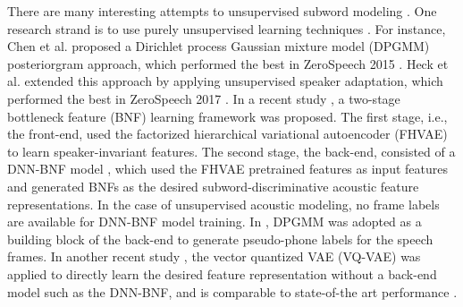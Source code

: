 \documentclass[a4paper]{article}
\begin{document}
There are many interesting attempts  to unsupervised subword modeling \cite{chen2015parallel,heck2017feature,chorowski2019unsupervised,shibata2017composite,feng2019_TASLP,riviere2020unsupervised,Feng2019combining}. One research strand is to use purely unsupervised learning techniques 
\cite{chen2015parallel,heck2017feature,chorowski2019unsupervised}. For instance, Chen et al. \cite{chen2015parallel} proposed a Dirichlet process Gaussian mixture model (DPGMM) posteriorgram approach, which performed the best in ZeroSpeech 2015 \cite{versteegh2015zero}.  Heck et al. extended this approach by applying unsupervised speaker adaptation, which performed the best in ZeroSpeech 2017 \cite{heck2017feature}. 
In a recent study \cite{Feng2019improving}, a two-stage bottleneck feature (BNF) learning framework was proposed.
The first stage, i.e., the front-end, used the factorized hierarchical variational autoencoder (FHVAE) \cite{hsu2017nips} to learn speaker-invariant features. The second stage, the back-end, consisted of a DNN-BNF model \cite{chen2017multilingual}, which used the FHVAE pretrained features as input features and generated BNFs as the desired subword-discriminative acoustic feature representations. In the case of unsupervised acoustic modeling, no frame labels are available for DNN-BNF model training.
In \cite{Feng2019improving},
 DPGMM was adopted  
 as a building block of the back-end
 to generate pseudo-phone labels for the speech frames.
In another recent study  \cite{chorowski2019unsupervised}, the vector quantized VAE (VQ-VAE) \cite{oord2017neural} was applied to directly learn the desired feature representation without a back-end model such as the DNN-BNF, and is comparable to state-of-the art performance \cite{heck2017feature}. 
\end{document}
